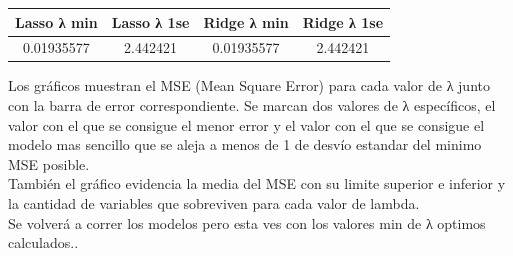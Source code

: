 \begin{center}
 \begin{tabular}{||c c c c||} 
 \hline
    Lasso λ min & Lasso λ 1se & Ridge λ min & Ridge λ 1se  \\ 
 \hline
    0.01935577 & 2.442421 & 0.01935577 & 2.442421\\
 \hline
 \hline
\end{tabular}
\end{center}


Los gráficos muestran el MSE (Mean Square Error) para cada valor de λ junto con la barra de error correspondiente. Se marcan dos valores de λ específicos, el valor con el que se consigue el menor error y el valor con el que se consigue el modelo mas sencillo que se aleja a menos de 1 de desvío estandar del minimo MSE posible. \\
También el gráfico evidencia la media del MSE con su limite superior e inferior y la cantidad de variables que sobreviven para cada valor de lambda.\\
Se volverá a correr los modelos pero esta ves con los valores min de λ optimos calculados..\\
















